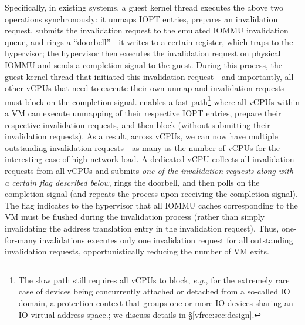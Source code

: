 Specifically, in existing systems, a guest kernel thread executes the above two operations synchronously: it unmaps IOPT entries, prepares an invalidation request, submits the invalidation request to the emulated IOMMU invalidation queue, and rings a ``doorbell''---it writes to a certain register, which traps to the hypervisor; the hypervisor then executes the invalidation request on physical IOMMU and sends a completion signal to the guest. During this process, the guest kernel thread that initiated this invalidation request---and importantly, all other vCPUs that need to execute their own unmap and invalidation requests---must block on the completion signal. {\vfreename} enables a fast path{\footnote{The slow path still requires all vCPUs to block, \textit{e.g.}, for the extremely rare case of devices being concurrently attached or detached from a so-called IO domain, a protection context that groups one or more IO devices sharing an IO virtual address space.; we discuss details in \S\ref{vfree:sec:design}.}} where all vCPUs within a VM can execute unmapping of their respective IOPT entries, prepare their respective invalidation requests, and then block (without submitting their invalidation requests). As a result, across vCPUs, we can now have multiple outstanding invalidation requests---as many as the number of vCPUs for the interesting case of high network load. A dedicated vCPU collects all invalidation requests from all vCPUs and submits \textit{one of the invalidation requests along with a certain flag described below}, rings the doorbell, and then polls on the completion signal (and repeats the process upon receiving the completion signal). The flag indicates to the hypervisor that all IOMMU caches corresponding to the VM must be flushed during the invalidation process (rather than simply invalidating the address translation entry in the invalidation request). Thus, one-for-many invalidations executes only one invalidation request for all outstanding invalidation requests, opportunistically reducing the number of VM exits.  

